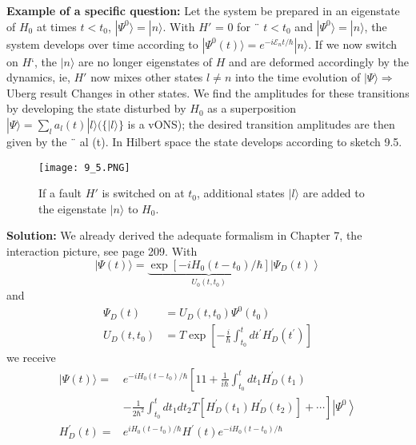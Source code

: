 \textbf{Example of a specific question:} Let the system be prepared in an eigenstate of $H_0$ at times $t <t_0$,  $|\Psi^0\rangle=|n\rangle$. With $H'$ = 0 for ¨ $t <t_0$ and  $|\Psi^0\rangle=|n\rangle$, the system develops over time according to $| \Psi^0 (t) \rangle = e^{-i\mathcal{E}_nt/\hbar} | n\rangle$. If we now switch on $H‘$, the $| n\rangle$ are no longer eigenstates of $H$ and are deformed accordingly by the dynamics, ie, $H'$ now mixes other states $l \neq n$ into the time evolution of $| \Psi\rangle\Rightarrow$ Uberg result Changes in other states. We find the amplitudes for these transitions by developing the state disturbed by $H_0$ as a superposition $| \Psi\rangle = \sum_l a_l (t) | l\rangle (\{| l\rangle\}$ is a vONS); the desired transition amplitudes are then given by the ¨ al (t). In Hilbert space the state develops according to sketch 9.5.
\begin{figure}[ht]
    \begin{minipage}{0.5\textwidth}
        \centering
        \texttt{[image: 9\_5.PNG]}
    \end{minipage}
    \begin{minipage}{0.5\textwidth}
        \caption{If a fault $H'$ is switched on at $t_0$, additional states $|l\rangle$ are added to the eigenstate $|n\rangle$ to $H_0$.}
    \end{minipage}
\end{figure}

\textbf{Solution:} We already derived the adequate formalism in Chapter 7, the interaction picture, see page {\color{red}209}. With
\begin{equation}
    |\Psi(t)\rangle=\underbrace{\exp \left[-i H_{0}\left(t-t_{0}\right) / \hbar\right]}_{U_{0}\left(t, t_{0}\right)}\left|\Psi_{D}(t)\right\rangle
    \end{equation}
and
\begin{equation}
\begin{aligned} \Psi_{D}(t) &=U_{D}\left(t, t_{0}\right) \Psi^{0}\left(t_{0}\right) \\ U_{D}\left(t, t_{0}\right) &=T \exp \left[-\frac{i}{\hbar} \int_{t_{0}}^{t} d t^{\prime} H_{D}^{\prime}\left(t^{\prime}\right)\right] \end{aligned}
\end{equation}
we receive
\begin{equation}
\begin{aligned}|\Psi(t)\rangle=& e^{-i H_{0}\left(t-t_{0}\right) / \hbar}\left[11+\frac{1}{i \hbar} \int_{t_{0}}^{t} d t_{1} H_{D}^{\prime}\left(t_{1}\right)\right.\\ &\left.-\frac{1}{2 \hbar^{2}} \int_{t_{0}}^{t} d t_{1} d t_{2} T\left[H_{D}^{\prime}\left(t_{1}\right) H_{D}^{\prime}\left(t_{2}\right)\right]+\cdots\right]\left|\Psi^{0}\right\rangle \\ H_{D}^{\prime}(t)=& e^{i H_{0}\left(t-t_{0}\right) / \hbar} H^{\prime}(t) e^{-i H_{0}\left(t-t_{0}\right) / \hbar} \end{aligned}
\end{equation}

